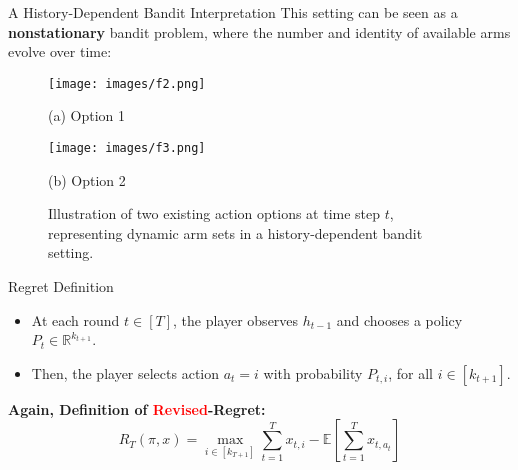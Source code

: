 \documentclass{beamer}
\begin{document}
\begin{frame}{A History-Dependent Bandit Interpretation}
    This setting can be seen as a \textbf{nonstationary} bandit problem, where the number and identity of available arms evolve over time:

    \begin{figure}
        \centering
        \begin{minipage}{0.48\linewidth}
            \centering
            \texttt{[image: images/f2.png]}
            \caption*{(a) Option 1}
        \end{minipage}
        \hfill
        \begin{minipage}{0.48\linewidth}
            \centering
            \texttt{[image: images/f3.png]}
            \caption*{(b) Option 2}
        \end{minipage}
        \caption{Illustration of two existing action options at time step \( t \), representing dynamic arm sets in a history-dependent bandit setting.}
    \end{figure}
\end{frame}


\begin{frame}{Regret Definition}

\begin{itemize}
    \item At each round \( t \in [T] \), the player observes \( h_{t-1} \) and chooses a policy \( P_t \in \mathbb{R}^{k_{t+1}} \).
    
    \item Then, the player selects action \( a_t = i \) with probability \( P_{t,i} \), for all \( i \in [k_{t+1}] \).
\end{itemize}

\vspace{2mm}

\textbf{Again, Definition of \textcolor{red}{Revised}-Regret:}
\[
R_T(\pi, x) = \max_{i \in [k_{T+1}]} \sum_{t=1}^{T} x_{t,i} - \mathbb{E} \left[ \sum_{t=1}^{T} x_{t, a_t} \right]
\]

\end{frame} 
\end{document}
